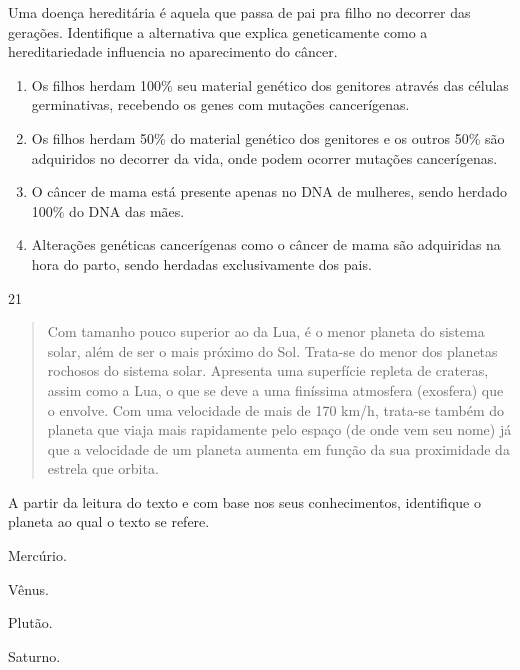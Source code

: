Uma doença hereditária é aquela que passa de pai pra filho no decorrer
das gerações. Identifique a alternativa que explica geneticamente como a
hereditariedade influencia no aparecimento do câncer.

\begin{enumerate}
\item
  Os filhos herdam 100\% seu material genético dos genitores através das
  células germinativas, recebendo os genes com mutações cancerígenas.
\item
  Os filhos herdam 50\% do material genético dos genitores e os outros
  50\% são adquiridos no decorrer da vida, onde podem ocorrer mutações
  cancerígenas.
\item
  O câncer de mama está presente apenas no DNA de mulheres, sendo herdado
  100\% do DNA das mães.
\item
  Alterações genéticas cancerígenas como o câncer de mama são adquiridas
  na hora do parto, sendo herdadas exclusivamente dos pais.
\end{enumerate}


\num{21}
\begin{quote}
  Com tamanho pouco superior ao da Lua, é o menor planeta do sistema solar, além de ser o mais próximo do Sol. Trata-se do menor
  dos planetas rochosos do sistema solar. Apresenta uma superfície repleta de crateras, assim como a Lua, o que se deve a uma
  finíssima atmosfera (exosfera) que o envolve. Com uma
  velocidade de mais de 170 km/h, trata-se também do
  planeta que viaja mais rapidamente pelo espaço (de onde vem seu nome)
  já que a velocidade de um planeta aumenta em função da sua proximidade
  da estrela que orbita.

\end{quote}

A partir da leitura do texto e com base nos seus conhecimentos,
identifique o planeta ao qual o texto se refere.

\begin{escolha}
\item
  Mercúrio.
\item
  Vênus.
\item
  Plutão.
\item
  Saturno.
\end{escolha}
